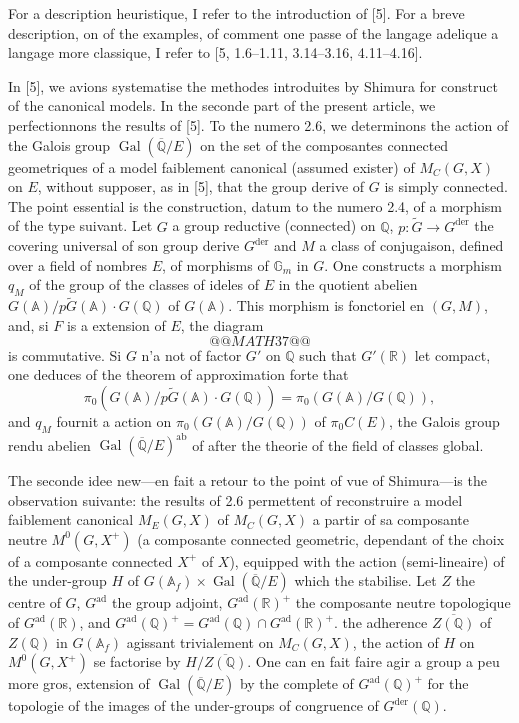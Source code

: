 \documentclass[12pt,a4paper]{article}
\theoremstyle{plain}
\theoremstyle{definition}
\theoremstyle{remark}
\DeclareMathOperator{\Gal}{Gal}
\newcommand{\QQ}{\mathbb{Q}}
\newcommand{\RR}{\mathbb{R}}
\newcommand{\Af}{\mathbb{A}_f}
\newcommand{\A}{\mathbb{A}}
\newcommand{\Gm}{\mathbb{G}}
\begin{document}
For a description heuristique, I refer to the introduction of [5]. For a breve description, on of the examples, of comment one passe of the langage adelique a langage more classique, I refer to [5, 1.6--1.11, 3.14--3.16, 4.11--4.16].

In [5], we avions systematise the methodes introduites by Shimura for construct of the canonical models. In the seconde part of the present article, we perfectionnons the results of [5]. To the numero 2.6, we determinons the action of the Galois group $\Gal(\overline{\QQ}/E)$ on the set of the composantes connected geometriques of a model faiblement canonical (assumed exister) of $M_C(G,X)$ on $E$, without supposer, as in [5], that the group derive of $G$ is simply connected. The point essential is the construction, datum to the numero 2.4, of a morphism of the type suivant. Let $G$ a group reductive (connected) on $\QQ$, $p:\tilde{G} \to G^{\text{der}}$ the covering universal of son group derive $G^{\text{der}}$ and $M$ a class of conjugaison, defined over a field of nombres $E$, of morphisms of $\Gm_m$ in $G$. One constructs a morphism $q_M$ of the group of the classes of ideles of $E$ in the quotient abelien $G(\A)/p\tilde{G}(\A)\cdot G(\QQ)$ of $G(\A)$. This morphism is fonctoriel en $(G,M)$, and, si $F$ is a extension of $E$, the diagram
\[
@@MATH37@@
\]
is commutative. Si $G$ n'a not of factor $G'$ on $\QQ$ such that $G'(\RR)$ let compact, one deduces of the theorem of approximation forte that
\[
\pi_0(G(\A)/p\tilde{G}(\A)\cdot G(\QQ)) = \pi_0(G(\A)/G(\QQ)),
\]
and $q_M$ fournit a action on $\pi_0(G(\A)/G(\QQ))$ of $\pi_0 C(E)$, the Galois group rendu abelien $\Gal(\overline{\QQ}/E)^{\text{ab}}$ of after the theorie of the field of classes global.

The seconde idee new---en fait a retour to the point of vue of Shimura---is the observation suivante: the results of 2.6 permettent of reconstruire a model faiblement canonical $M_E(G,X)$ of $M_C(G,X)$ a partir of sa composante neutre $M^0(G,X^+)$ (a composante connected geometric, dependant of the choix of a composante connected $X^+$ of $X$), equipped with the action (semi-lineaire) of the under-group $H$ of $G(\Af) \times \Gal(\overline{\QQ}/E)$ which the stabilise. Let $Z$ the centre of $G$, $G^{\text{ad}}$ the group adjoint, $G^{\text{ad}}(\RR)^+$ the composante neutre topologique of $G^{\text{ad}}(\RR)$, and $G^{\text{ad}}(\QQ)^+ = G^{\text{ad}}(\QQ) \cap G^{\text{ad}}(\RR)^+$. the adherence $\overline{Z(\QQ)}$ of $Z(\QQ)$ in $G(\Af)$ agissant trivialement on $M_C(G,X)$, the action of $H$ on $M^0(G,X^+)$ se factorise by $H/\overline{Z(\QQ)}$. One can en fait faire agir a group a peu more gros, extension of $\Gal(\overline{\QQ}/E)$ by the complete of $G^{\text{ad}}(\QQ)^+$ for the topologie of the images of the under-groups of congruence of $G^{\text{der}}(\QQ)$.
\end{document}
